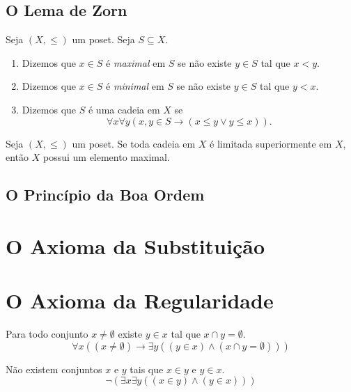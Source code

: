 \subsection{O Lema de Zorn}

\begin{definition}
    Seja $(X, \leq)$ um poset. Seja $S \subseteq X$.
        \begin{enumerate}[leftmargin=*, align=left, label=\textbf{(\alph*)}]
            \item Dizemos que $x \in S$ é \emph{maximal} em $S$ se não existe $y \in S$ tal que $x < y$.
            \item Dizemos que $x \in S$ é \emph{minimal} em $S$ se não existe $y \in S$ tal que $y < x$.
            \item Dizemos que $S$ é uma cadeia em $X$ se
                \[
                    \forall x \forall y (x,y \in S \rightarrow (x \leq y \lor y \leq x)).
                \]
        \end{enumerate}
\end{definition}

\begin{theorem}
    Seja $(X, \leq)$ um poset. Se toda cadeia em $X$ é limitada superiormente em $X$, então $X$ possui um elemento maximal.
\end{theorem}

\subsection{O Princípio da Boa Ordem}

\section{O Axioma da Substituição}

\section{O Axioma da Regularidade}

\begin{axiom}[da Regularidade]
    Para todo conjunto $x \neq \emptyset$ existe $y \in x$ tal que $x \cap y = \emptyset$.
        \[
            \boxed{
                \forall x ((x \neq \emptyset) \rightarrow \exists y ( (y \in x) \land (x \cap y = \emptyset)))
            }
        \]
\end{axiom}

\begin{proposition} \label{prop.set:xinyeyinxabs}
    Não existem conjuntos $x$ e $y$ tais que $x \in y$ e $y \in x$.
        \[
            \neg (\exists x \exists y ((x \in y) \land (y \in x)))
        \]
\end{proposition}

